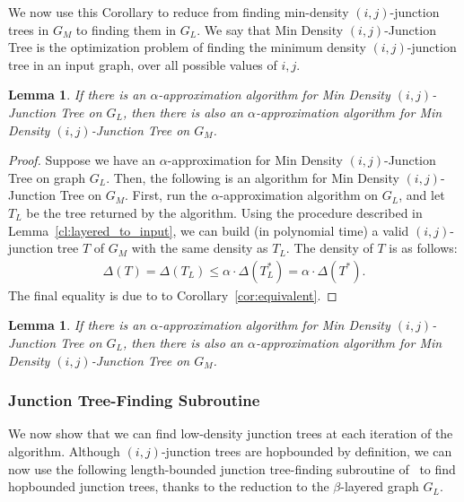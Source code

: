 \documentclass{article}
\newtheorem{lemma}[theorem]{Lemma}
\theoremstyle{definition}
\theoremstyle{remark}
\def\jt {{\sc Min Density $(i,j)$-Junction Tree}}
\begin{document}
We now use this Corollary to reduce from finding min-density $(i,j)$-junction trees in $G_M$ to finding them in $G_L$. We say that {\jt} is the optimization problem of finding the minimum density $(i,j)$-junction tree in an input graph, over all possible values of $i,j$.

\begin{lemma}
\label{lem:reduction}
     If there is an $\alpha$-approximation algorithm for {\jt} on $G_L$, then there is also an $\alpha$-approximation algorithm for {\jt} on $G_M$. 
\end{lemma}
\begin{proof}
    Suppose we have an $\alpha$-approximation for {\jt} on graph $G_L$. Then, the following is an algorithm for {\jt} on $G_M$. First, run the $\alpha$-approximation algorithm on $G_L$, and let $T_L$ be the tree returned by the algorithm. Using the procedure described in Lemma~\ref{cl:layered_to_input}, we can build (in polynomial time) a valid $(i,j)$-junction tree $T$ of $G_M$ with the same density as $T_L$. The density of $T$ is as follows:
    \begin{align*}
        \Delta(T) = \Delta(T_L) \leq \alpha \cdot \Delta(T_L^*) = \alpha \cdot \Delta(T^*).
    \end{align*}
    The final equality is due to to Corollary~\ref{cor:equivalent}.
\end{proof}

\else
\begin{lemma}
\label{lem:reduction}
     If there is an $\alpha$-approximation algorithm for {\jt} on $G_L$, then there is also an $\alpha$-approximation algorithm for {\jt} on $G_M$. 
\end{lemma}
\fi

\subsubsection{Junction Tree-Finding Subroutine}
We now show that we can find low-density junction trees at each iteration of the algorithm. Although $(i,j)$-junction trees are hopbounded by definition,  we can now use the following length-bounded junction tree-finding subroutine of~\cite{GKL23} to find hopbounded junction trees, thanks to the reduction to the $\beta$-layered graph $G_L$.
\end{document}
